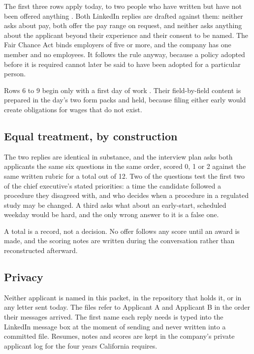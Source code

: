 The first three rows apply today, to two people who have written but have not
been offered anything \cite{calab4323,cagov12952}. Both LinkedIn replies are
drafted against them: neither asks about pay, both offer the pay range on
request, and neither asks anything about the applicant beyond their experience
and their consent to be named. The Fair Chance Act binds employers of five or
more, and the company has one member and no employees. It follows the rule
anyway, because a policy adopted before it is required cannot later be said to
have been adopted for a particular person.

Rows 6 to 9 begin only with a first day of work
\cite{uscisi92026,everify2026,calab2814,eddregister2026,eddnewhire2026}. Their
field-by-field content is
prepared in the day's two form packs and held, because filing either early
would create obligations for wages that do not exist.

\subsection{Equal treatment, by construction}

The two replies are identical in substance, and the interview plan asks both
applicants the same six questions in the same order, scored 0, 1 or 2 against
the same written rubric for a total out of 12. Two of the questions test the
first two of the chief executive's stated priorities: a time the candidate
followed a procedure they disagreed with, and who decides when a procedure in a
regulated study may be changed. A third asks what about an early-start,
scheduled weekday would be hard, and the only wrong answer to it is a false one.

A total is a record, not a decision. No offer follows any score until an award
is made, and the scoring notes are written during the conversation rather than
reconstructed afterward.

\subsection{Privacy}

Neither applicant is named in this packet, in the repository that holds it, or
in any letter sent today. The files refer to Applicant A and Applicant B in the
order their messages arrived. The first name each reply needs is typed into the
LinkedIn message box at the moment of sending and never written into a committed
file. Resumes, notes and scores are kept in the company's private applicant log
for the four years California requires.


